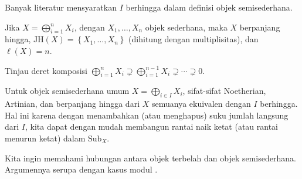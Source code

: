 Banyak literatur mensyaratkan $I$ berhingga dalam definisi objek
semisederhana.

\begin{lema}
    Jika $X=\bigoplus_{i=1}^nX_i$, dengan $X_1,\ldots,X_n$ objek sederhana,
maka $X$ berpanjang hingga, $\mathrm{JH}(X)=\left\{X_1,\ldots,X_n\right\}$
(dihitung dengan multiplisitas), dan $\ell(X)=n$.
\end{lema}
\begin{bukti}
    Tinjau deret komposisi
$\bigoplus_{i=1}^nX_i\supsetneq\bigoplus_{i=1}^{n-1}X_i\supsetneq\cdots\supsetneq0$.
\end{bukti}

\begin{catatan}
    Untuk objek semisederhana umum $X=\bigoplus_{i\in I}X_i$, sifat-sifat
Noetherian, Artinian, dan berpanjang hingga dari $X$ semuanya ekuivalen dengan
$I$ berhingga. Hal ini karena dengan menambahkan (atau menghapus) suku jumlah
langsung dari $I$, kita dapat dengan mudah membangun rantai naik ketat (atau
rantai menurun ketat) dalam $\mathrm{Sub}_X$.
\end{catatan}

Kita ingin memahami hubungan antara objek terbelah dan objek semisederhana.
Argumennya serupa dengan kasus modul \cite[Proposisi 6.11.4]{Li1}.


